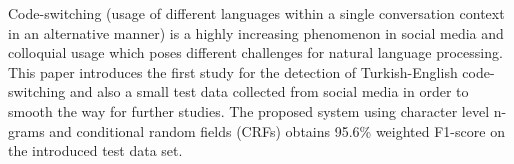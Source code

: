 Code-switching (usage of different languages within a single conversation context in an alternative manner) is a highly increasing phenomenon in social media and colloquial usage which poses different challenges for natural language processing. This paper introduces the first study for the detection of Turkish-English code-switching and also a small test data collected from social media in order to smooth the way for further studies. The proposed system using character level n-grams and conditional random fields (CRFs) obtains 95.6\% weighted F1-score on the introduced test data set.

